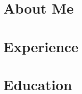 \documentclass{article}
\begin{document}
\section{About Me}

\section{Experience}

\section{Education}
\end{document}
